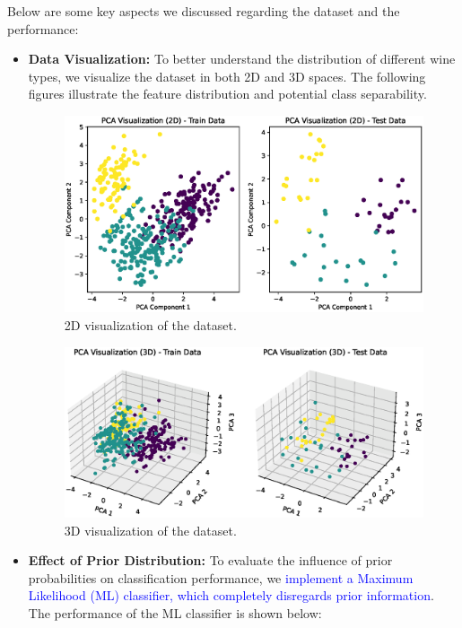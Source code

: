 Below are some key aspects we discussed regarding the dataset and the performance:
\begin{itemize}
    \item \textbf{Data Visualization:}  
    To better understand the distribution of different wine types, we visualize 
    the dataset in both 2D and 3D spaces. The following figures illustrate the 
    feature distribution and potential class separability.
    \begin{figure}[H]
        \centering
        \includegraphics[scale=0.7]{2D_visualize.eps}
        \caption{2D visualization of the dataset.}
        \label{fig:2d_visual}
    \end{figure}
    \begin{figure}[H]
        \centering
        \includegraphics[scale=0.7]{3D_visualize.eps}
        \caption{3D visualization of the dataset.}
        \label{fig:3d_visual}
    \end{figure}
    
    \item \textbf{Effect of Prior Distribution:}  
    To evaluate the influence of prior probabilities on classification performance, 
    we \textcolor{blue}{implement a Maximum Likelihood (ML) classifier, which completely 
    disregards prior information}. The performance of the ML classifier is shown below:


\end{itemize}
